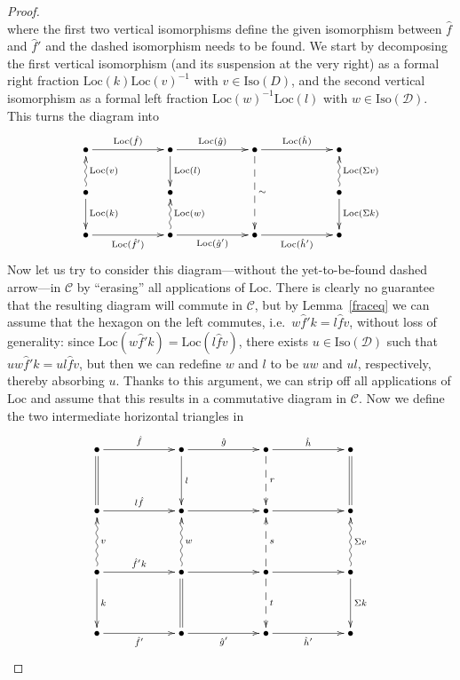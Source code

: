 \documentclass{amsproc}
\theoremstyle{definition}
\begin{document}
\begin{proof}
\[\]
where the first two vertical isomorphisms define the given isomorphism between $\hat{f}$ and $\hat{f}'$ and the dashed isomorphism needs to be found. We start by decomposing the first vertical isomorphism (and its suspension at the very right) as a formal right fraction ${\mathrm{Loc}}(k){\mathrm{Loc}}(v)^{-1}$ with $v\in{\mathrm{Iso}}(D)$, and the second vertical isomorphism as a formal left fraction ${\mathrm{Loc}}(w)^{-1}{\mathrm{Loc}}(l)$ with $w\in{\mathrm{Iso}}({\mathcal{D}})$. This turns the diagram into
\[
	\xymatrix@!C@C+33pt{ \bullet \ar[r]^{{\mathrm{Loc}}(\hat{f})} \ar@{<~}[d]^{{\mathrm{Loc}}(v)} & \bullet \ar[r]^{{\mathrm{Loc}}(\hat{g})} \ar[d]^{{\mathrm{Loc}}(l)} & \bullet \ar[r]^{{\mathrm{Loc}}(\hat{h})} \ar@{-->}[dd]^{\sim} & \bullet \ar@{<~}[d]^{{\mathrm{Loc}}(\Sigma v)} \\
	\bullet \ar[d]^{{\mathrm{Loc}}(k)} & \bullet \ar@{<~}[d]^{{\mathrm{Loc}}(w)} & & \bullet \ar[d]^{{\mathrm{Loc}}(\Sigma k)} \\
	\bullet \ar[r]_{{\mathrm{Loc}}(\hat{f}')} & \bullet \ar[r]_{{\mathrm{Loc}}(\hat{g}')} & \bullet \ar[r]_{{\mathrm{Loc}}(\hat{h}')} & \bullet}
\]
Now let us try to consider this diagram---without the yet-to-be-found dashed arrow---in $\mathcal{C}$ by ``erasing'' all applications of ${\mathrm{Loc}}$. There is clearly no guarantee that the resulting diagram will commute in ${\mathcal{C}}$, but by Lemma~\ref{fraceq} we can assume that the hexagon on the left commutes, i.e.~$w\hat{f}'k=l\hat{f}v$, without loss of generality: since ${\mathrm{Loc}}(w\hat{f}'k)={\mathrm{Loc}}(l\hat{f}v)$, there exists $u\in{\mathrm{Iso}}({\mathcal{D}})$ such that $uw\hat{f}'k=ul\hat{f}v$, but then we can redefine $w$ and $l$ to be $uw$ and $ul$, respectively, thereby absorbing $u$. Thanks to this argument, we can strip off all applications of ${\mathrm{Loc}}$ and assume that this results in a commutative diagram in ${\mathcal{C}}$. Now we define the two intermediate horizontal triangles in
\[
	\xymatrix@!C@C+33pt@!R@R+15pt{ \bullet \ar[r]^{\hat{f}} \ar@{=}[d] & \bullet \ar[r]^{\hat{g}} \ar[d]^{l} & \bullet \ar[r]^{\hat{h}} \ar@{-->}[d]^r & \bullet \ar@{=}[d] \\
	\bullet \ar[r]^{l\hat{f}} \ar@{<~}[d]^{v} & \bullet \ar[r] \ar@{<~}[d]^{w} & \bullet \ar[r] \ar@{<--}[d]^s & \bullet \ar@{<~}[d]^{\Sigma v} \\
	\bullet \ar[r]^{\hat{f}'k} \ar[d]^{k}  & \bullet \ar[r] \ar@{=}[d] & \bullet \ar[r] \ar@{-->}[d]^t & \bullet \ar[d]^{\Sigma k} \\
	\bullet \ar[r]_{\hat{f}'} & \bullet \ar[r]_{\hat{g}'} & \bullet \ar[r]_{\hat{h}'} & \bullet}
\]
\end{proof}
\end{document}
